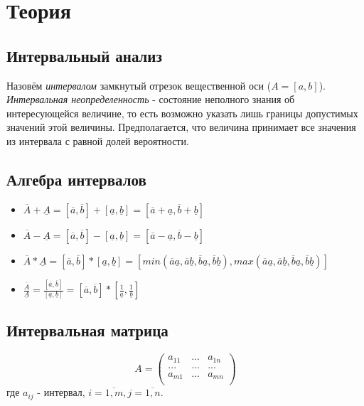 \documentclass[12pt,a4paper]{article}
\begin{document}
\section{Теория}
\subsection{Интервальный анализ}
Назовём \textit{интервалом} замкнутый отрезок вещественной оси ($A=[a,b]$). \textit{Интервальная неопределенность} - состояние неполного знания об интересующейся величине, то есть возможно указать лишь границы допустимых значений этой величины. Предполагается, что величина принимает все значения из интервала с равной долей вероятности.

\subsection{Алгебра интервалов}
\begin{itemize}
    \item $\overline{A}+\underline{A}=[\overline{a},\overline{b}]+[\underline{a},\underline{b}]=[\overline{a}+\underline{a},\overline{b}+\underline{b}]$
    \item $\overline{A}-\underline{A}=[\overline{a},\overline{b}]-[\underline{a},\underline{b}]=[\overline{a}-\underline{a},\overline{b}-\underline{b}]$
    \item $\overline{A}*\underline{A}=[\overline{a},\overline{b}]*[\underline{a},\underline{b}]=[min(\overline{a}\underline{a},\overline{a}\underline{b},\overline{b}\underline{a},\overline{b}\underline{b}),max(\overline{a}\underline{a},\overline{a}\underline{b},\overline{b}\underline{a},\overline{b}\underline{b})]$
    \item $\frac{\overline{A}}{\underline{A}}=\frac{[\overline{a},\overline{b}]}{[\underline{a},\underline{b}]}=[\overline{a},\overline{b}]*[\frac{1}{\underline{a}},\frac{1}{\underline{b}}]$
\end{itemize}

\subsection{Интервальная матрица}
\begin{equation}
    A=
        \begin{pmatrix}
            a_{11} & ... & a_{1n}\\
            ... & ... & ...\\
            a_{m1} & ... & a_{mn}\\
        \end{pmatrix}
\end{equation}
где $a_{ij}$ - интервал, $i=\overline{1,m},j=\overline{1,n}$.
\end{document}
